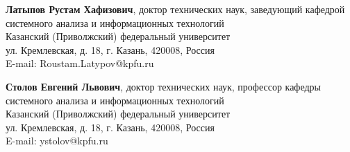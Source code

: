 \documentclass[a4paper,12pt]{article}
\begin{document}
\vspace{1cm}

\noindent \textbf{Латыпов Рустам Хафизович}, доктор технических наук, заведующий кафедрой системного анализа и информационных технологий \\
Казанский (Приволжский) федеральный университет \\
ул. Кремлевская, д. 18, г. Казань, 420008, Россия \\
E-mail: Roustam.Latypov@kpfu.ru

\noindent \textbf{Столов Евгений Львович}, доктор технических наук, профессор кафедры системного анализа и информационных технологий \\
Казанский (Приволжский) федеральный университет \\
ул. Кремлевская, д. 18, г. Казань, 420008, Россия \\
E-mail: ystolov@kpfu.ru
\end{document}
